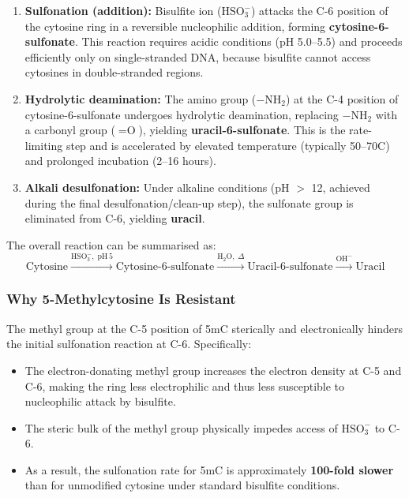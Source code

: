 \begin{enumerate}[itemsep=3pt]
  \item \textbf{Sulfonation (addition):} Bisulfite ion ($\text{HSO}_3^{-}$) attacks the C-6 position of the cytosine ring in a reversible nucleophilic addition, forming \textbf{cytosine-6-sulfonate}. This reaction requires acidic conditions (pH 5.0--5.5) and proceeds efficiently only on single-stranded DNA, because bisulfite cannot access cytosines in double-stranded regions.
  \item \textbf{Hydrolytic deamination:} The amino group ($-\text{NH}_2$) at the C-4 position of cytosine-6-sulfonate undergoes hydrolytic deamination, replacing $-\text{NH}_2$ with a carbonyl group ($=\text{O}$), yielding \textbf{uracil-6-sulfonate}. This is the rate-limiting step and is accelerated by elevated temperature (typically 50--70\textdegree{}C) and prolonged incubation (2--16 hours).
  \item \textbf{Alkali desulfonation:} Under alkaline conditions (pH $>$ 12, achieved during the final desulfonation/clean-up step), the sulfonate group is eliminated from C-6, yielding \textbf{uracil}.
\end{enumerate}

The overall reaction can be summarised as:
\begin{equation}
\label{eq:methylation:bisulfite-overall}
\text{Cytosine} \xrightarrow{\text{HSO}_3^{-},\;\text{pH}\,5} \text{Cytosine-6-sulfonate} \xrightarrow{\text{H}_2\text{O},\;\Delta} \text{Uracil-6-sulfonate} \xrightarrow{\text{OH}^{-}} \text{Uracil}
\end{equation}

\subsubsection{Why 5-Methylcytosine Is Resistant}

The methyl group at the C-5 position of 5mC sterically and electronically hinders the initial sulfonation reaction at C-6. Specifically:
\begin{itemize}[itemsep=2pt]
  \item The electron-donating methyl group increases the electron density at C-5 and C-6, making the ring less electrophilic and thus less susceptible to nucleophilic attack by bisulfite.
  \item The steric bulk of the methyl group physically impedes access of $\text{HSO}_3^{-}$ to C-6.
  \item As a result, the sulfonation rate for 5mC is approximately \textbf{100-fold slower} than for unmodified cytosine under standard bisulfite conditions.
\end{itemize}

